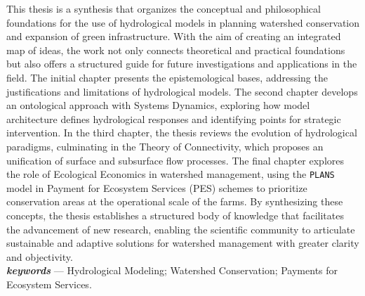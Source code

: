 \documentclass[./main.tex]{subfiles}
\begin{document}
\large
\begin{center}
    \vspace{5mm}
\end{center}
\singlespacing
\normalsize
This thesis is a synthesis that organizes the conceptual and philosophical foundations for the use of hydrological models in planning watershed conservation and expansion of green infrastructure. With the aim of creating an integrated map of ideas, the work not only connects theoretical and practical foundations but also offers a structured guide for future investigations and applications in the field. The initial chapter presents the epistemological bases, addressing the justifications and limitations of hydrological models. The second chapter develops an ontological approach with Systems Dynamics, exploring how model architecture defines hydrological responses and identifying points for strategic intervention. In the third chapter, the thesis reviews the evolution of hydrological paradigms, culminating in the Theory of Connectivity, which proposes an unification of surface and subsurface flow processes. The final chapter explores the role of Ecological Economics in watershed management, using the \texttt{PLANS} model in Payment for Ecosystem Services (PES) schemes to prioritize conservation areas at the operational scale of the farms. By synthesizing these concepts, the thesis establishes a structured body of knowledge that facilitates the advancement of new research, enabling the scientific community to articulate sustainable and adaptive solutions for watershed management with greater clarity and objectivity.\\[2ex]
	
\noindent \textit{\textbf{keywords}} --- Hydrological Modeling; Watershed Conservation; Payments for Ecosystem Services.

\clearpage
\end{document}
